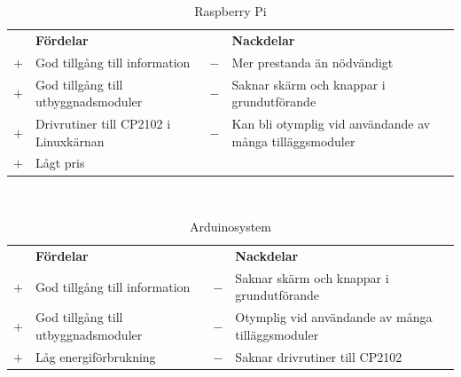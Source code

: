 \documentclass{article}
\begin{document}
            \begin{table}[ht]
                \caption{Raspberry Pi}\label{tab:rpi}
                \begin{tabularx}{\textwidth}{@{}cXcX}
                    & \textbf{Fördelar}     & & \textbf{Nackdelar} \\
                    $+$ & God tillgång till information & 
                                            $-$ & Mer prestanda än nödvändigt \\
                    $+$ & God tillgång till utbyggnads\-moduler & 
                                            $-$ & Saknar skärm och knappar i 
                                                  grundutförande \\
                    $+$ & Drivrutiner till CP2102 i Linuxkärnan &
                                            $-$ & Kan bli otymplig vid användande av   
                                                  många tilläggsmoduler \\   
                    $+$ & Lågt pris \\   
                \end{tabularx}\\
            \end{table}

            \begin{table}[h!]
            \caption{Arduinosystem}\label{tab:ardu}
                \begin{tabularx}{\textwidth}{@{}cXcX} 
                    & \textbf{Fördelar}     & & \textbf{Nackdelar} \\
                    $+$ & God tillgång till information & 
                                            $-$ & Saknar skärm och knappar i 
                                                grundutförande \\
                    $+$ & God tillgång till utbyggnads\-moduler & 
                                            $-$ & Otymplig vid användande av   
                                                många tilläggsmoduler \\
                    $+$ & Låg energiförbrukning &
                                            $-$ & Saknar drivrutiner till CP2102 \\

                \end{tabularx}\\
            \end{table}
\end{document}
